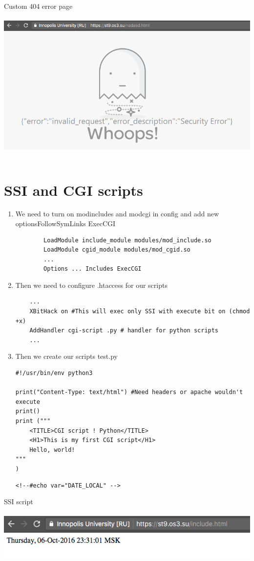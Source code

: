 \documentclass[10pt]{article}
\begin{document}
Custom 404 error page \\ \\
\includegraphics[width=\textwidth, scale=0.5]{404} \\ \\


\section{SSI and CGI scripts}
\begin{enumerate}
\item We need to turn on modincludes and modcgi in config and add new optionsFollowSymLinks ExecCGI
    \begin{verbatim}
        LoadModule include_module modules/mod_include.so
        LoadModule cgid_module modules/mod_cgid.so
        ...
        Options ... Includes ExecCGI
    \end{verbatim}
\item Then we need to configure .htaccess for our scripts
\begin{verbatim}
    ...
    XBitHack on #This will exec only SSI with execute bit on (chmod +x)
    AddHandler cgi-script .py # handler for python scripts
    ...
\end{verbatim}
\item Then we create our scripts
test.py
\begin{verbatim}
#!/usr/bin/env python3

print("Content-Type: text/html") #Need headers or apache wouldn't execute
print()
print ("""
    <TITLE>CGI script ! Python</TITLE>
    <H1>This is my first CGI script</H1>
    Hello, world!
"""
)
\end{verbatim}
\begin{verbatim}
<!--#echo var="DATE_LOCAL" -->
\end{verbatim}
\end{enumerate}
SSI script \\ \\
\includegraphics[width=\textwidth, scale=0.5]{ssi}\\ \\
\end{document}
